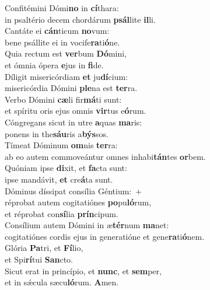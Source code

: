 \evenverse Confitémini Dómi\textbf{no} in \textbf{cí}thara:~\*\\
\evenverse in psaltério decem chordárum \textbf{psál}lite \textbf{il}li.\\
\oddverse Cantáte ei \textbf{cán}ticum \textbf{no}vum:~\*\\
\oddverse bene psállite ei in vocife\textbf{ra}ti\textbf{ó}ne.\\
\evenverse Quia rectum est \textbf{ver}bum \textbf{Dó}mini,~\*\\
\evenverse et ómnia ópera \textbf{e}jus in \textbf{fi}de.\\
\oddverse Díligit misericórdiam \textbf{et} ju\textbf{dí}cium:~\*\\
\oddverse misericórdia Dómini \textbf{ple}na est \textbf{ter}ra.\\
\evenverse Verbo Dómini \textbf{cæ}li fir\textbf{má}ti sunt:~\*\\
\evenverse et spíritu oris ejus omnis \textbf{vir}tus e\textbf{ó}rum.\\
\oddverse Cóngregans sicut in utre \textbf{a}quas \textbf{ma}ris:~\*\\
\oddverse ponens in the\textbf{sáu}ris a\textbf{býs}sos.\\
\evenverse Tímeat Dóminum \textbf{om}nis \textbf{ter}ra:~\*\\
\evenverse ab eo autem commoveántur omnes inhabi\textbf{tán}tes \textbf{or}bem.\\
\oddverse Quóniam ipse \textbf{di}xit, et \textbf{fa}cta sunt:~\*\\
\oddverse ipse mandávit, \textbf{et} cre\textbf{á}ta sunt.\\
\evenverse Dóminus díssipat consília Géntium:~+\\
\evenverse  réprobat autem cogitatiónes \textbf{po}pu\textbf{ló}rum,~\*\\
\evenverse et réprobat con\textbf{sí}lia \textbf{prín}cipum.\\
\oddverse Consílium autem Dómini in æ\textbf{tér}num \textbf{ma}net:~\*\\
\oddverse cogitatiónes cordis ejus in generatióne et gene\textbf{ra}ti\textbf{ó}nem.\\
\evenverse Glória \textbf{Pa}tri, et \textbf{Fí}lio,~\*\\
\evenverse et Spi\textbf{rí}tui \textbf{San}cto.\\
\oddverse Sicut erat in princípio, et \textbf{nunc}, et \textbf{sem}per,~\*\\
\oddverse et in sǽcula sæcu\textbf{ló}rum. \textbf{A}men.\\
